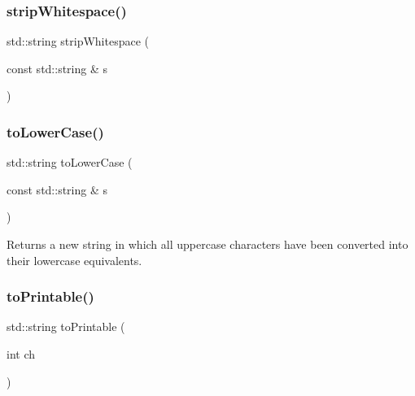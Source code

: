 \mbox{\label{namespacestringutils_a76709c55b9e0bcea3f17b9abc8962ae7}} 
\subsubsection{\texorpdfstring{strip\+Whitespace()}{stripWhitespace()}}
{\footnotesize\ttfamily std\+::string strip\+Whitespace (\begin{DoxyParamCaption}\item[{const std\+::string \&}]{s }\end{DoxyParamCaption})}

\mbox{\label{namespacestringutils_a55769baf0b588c5d12813228a2e00389}} 
\subsubsection{\texorpdfstring{to\+Lower\+Case()}{toLowerCase()}}
{\footnotesize\ttfamily std\+::string to\+Lower\+Case (\begin{DoxyParamCaption}\item[{const std\+::string \&}]{s }\end{DoxyParamCaption})}



Returns a new string in which all uppercase characters have been converted into their lowercase equivalents. 

\mbox{\label{namespacestringutils_a76282454fe7a94b5e58421de779e002f}} 
\subsubsection{\texorpdfstring{to\+Printable()}{toPrintable()}}
{\footnotesize\ttfamily std\+::string to\+Printable (\begin{DoxyParamCaption}\item[{int}]{ch }\end{DoxyParamCaption})}

\mbox{\label{namespacestringutils_a3dc91629a4fc8f472be9bd83f6514c25}} 
